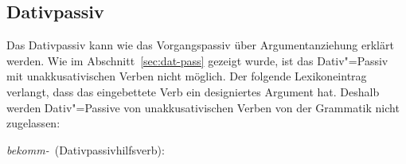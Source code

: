 


\subsection{Dativpassiv}
\label{sec-anal-dativpassiv}

Das
Dativpassiv kann wie das Vorgangspassiv %
über Argumentanziehung
erklärt werden. Wie im Abschnitt~\ref{sec:dat-pass} gezeigt wurde, ist das Dativ"=Passiv
mit unakkusativischen Verben nicht möglich. Der folgende Lexikoneintrag
verlangt, dass das eingebettete Verb ein designiertes Argument hat. Deshalb
werden Dativ"=Passive von unakkusativischen Verben von der Grammatik nicht zugelassen:

\eas
\label{le-bekommen-passive-da}
\mbox{\emph{bekomm-} (Dativpassivhilfsverb):} \\
\zs

